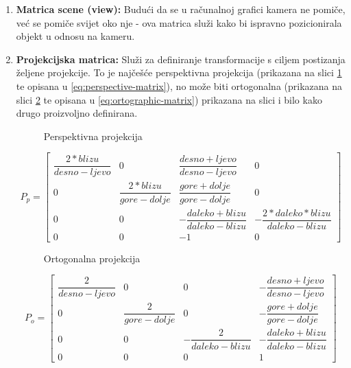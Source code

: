 \begin{enumerate}
\item \textbf{Matrica scene (view):} Budući da se u računalnoj grafici kamera ne pomiče, već se pomiče svijet oko nje - ova matrica služi kako bi ispravno pozicionirala objekt u odnosu na kameru.

\item \textbf{Projekcijska matrica:} Služi za definiranje transformacije s ciljem postizanja željene projekcije. To je najčešće perspektivna projekcija (prikazana na slici \ref{fig:projection-perspective} te opisana u \ref{eq:perspective-matrix}), no može biti ortogonalna (prikazana na slici \ref{fig:projection-ortho} te opisana u \ref{eq:ortographic-matrix}) prikazana na slici i bilo kako drugo proizvoljno definirana.

\begin{figure}[H]
\centering{}
\caption{Perspektivna projekcija\cite{blender-projection}}
\label{fig:projection-perspective}
\end{figure}

\begin{equation}
\label{eq:perspective-matrix}
	P_p = 
	\begin{bmatrix}
		\dfrac{2 * blizu}{desno - ljevo} & 0 & \dfrac{desno + ljevo}{desno - ljevo} & 0\\
		0 & \dfrac{2 * blizu}{gore - dolje} & \dfrac{gore + dolje}{gore - dolje} & 0\\
		0 & 0 & -\dfrac{daleko + blizu}{daleko - blizu} & -\dfrac{2 * daleko * blizu}{daleko - blizu}\\
		0 & 0 & -1 & 0
	\end{bmatrix}
\end{equation}

\begin{figure}[H]
\centering{}
\caption{Ortogonalna projekcija\cite{blender-projection}}
\label{fig:projection-ortho}
\end{figure}

\begin{equation}
\label{eq:ortographic-matrix}
	P_o = 
	\begin{bmatrix}
		\dfrac{2}{desno - ljevo} & 0 & 0 & -\dfrac{desno + ljevo}{desno - ljevo}\\
		0 & \dfrac{2}{gore - dolje} & 0 & -\dfrac{gore + dolje}{gore - dolje}\\
		0 & 0 & -\dfrac{2}{daleko - blizu} & -\dfrac{daleko + blizu}{daleko - blizu}\\
		0 & 0 & 0 & 1
	\end{bmatrix}
\end{equation}

\end{enumerate}

